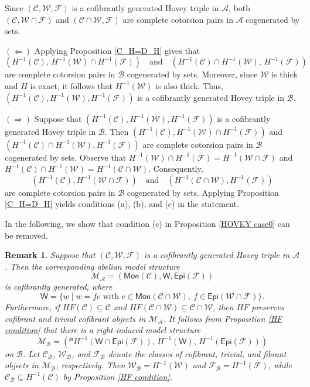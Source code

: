 \documentclass[12pt,twoside]{amsart}
\theoremstyle{bfupright head,slanted body}
\theoremstyle{bfupright head,upright body}
\theoremstyle{fixed bf head,slanted body}
\theoremstyle{fixed bf head,upright body}
\newtheorem{rmk}[res]{Remark}           \newtheorem*{rmk*}{Remark}
\theoremstyle{numbered paragraph}
\newenvironment{prf*}[1][Proof]{%
  \begin{proof}[\bf #1]
    \setcounter{equation}{0}
    \renewcommand{\theequation}{\arabic{equation}}}
  {\end{proof}
}
\numberwithin{equation}{res}
\newcommand{\calC}{\mathcal{C}}
\newcommand{\calW}{\mathcal{W}}
\newcommand{\calF}{\mathcal{F}}
\newcommand{\calA}{\mathcal{A}}
\newcommand{\calB}{\mathcal{B}}
\newcommand{\calM}{\mathcal{M}}
\newcommand{\Mon}{\mathsf{Mon}}
\newcommand{\Epi}{\mathsf{Epi}}
\newcommand{\sfW}{\mathsf{W}}
\begin{document}
\begin{prf*}
Since \((\calC,\calW,\calF)\) is a cofibrantly generated Hovey triple in \(\calA\), both \((\calC,\calW\cap\calF)\) and \((\calC\cap\calW,\calF)\) are complete cotorsion pairs in \(\calA\) cogenerated by sets.

\((\Leftarrow)\)
Applying Proposition \ref{C_H=D_H} gives that
\[
(H^{-1}(\calC),\, H^{-1}(\calW)\cap H^{-1}(\calF))
\quad\text{and}\quad
(H^{-1}(\calC)\cap H^{-1}(\calW),\, H^{-1}(\calF))
\]
are complete cotorsion pairs in \(\calB\) cogenerated by sets.
Moreover, since \(\calW\) is thick and \(H\) is exact, it follows that \(H^{-1}(\calW)\) is also thick.
Thus, \((H^{-1}(\calC),H^{-1}(\calW),H^{-1}(\calF))\) is a cofibrantly generated Hovey triple in \(\calB\).

\((\Rightarrow)\)
Suppose that \((H^{-1}(\calC),H^{-1}(\calW),H^{-1}(\calF))\) is a cofibrantly generated Hovey triple in \(\calB\).
Then
\((H^{-1}(\calC), H^{-1}(\calW)\cap H^{-1}(\calF))\)
and
\((H^{-1}(\calC)\cap H^{-1}(\calW), H^{-1}(\calF))\)
are complete cotorsion pairs in \(\calB\) cogenerated by sets.
Observe that
\(H^{-1}(\calW)\cap H^{-1}(\calF)=H^{-1}(\calW\cap\calF)\)
and
\(H^{-1}(\calC)\cap H^{-1}(\calW)=H^{-1}(\calC\cap\calW)\).
Consequently,
\[
(H^{-1}(\calC), H^{-1}(\calW\cap\calF))
\quad\text{and}\quad
(H^{-1}(\calC\cap\calW), H^{-1}(\calF))
\]
are complete cotorsion pairs in \(\calB\) cogenerated by sets.
Applying Proposition \ref{C_H=D_H} yields conditions (a), (b), and (c) in the statement.
\end{prf*}

In the following, we show that condition (c) in Proposition \ref{HOVEY case0} can be removed.

\begin{rmk}\label{rmk2.13}
Suppose that \((\calC,\calW,\calF)\) is a cofibrantly generated Hovey triple in \(\calA\). Then the corresponding abelian model structure
\[
\calM_\calA=(\Mon(\calC),\sfW,\Epi(\calF))
\]
is cofibrantly generated, where
\[
\sfW=\{ w \mid w=fc \text{ with } c\in\Mon(\calC\cap\calW),\ f\in\Epi(\calW\cap\calF)\}.
\]
Furthermore, if \(HF(\calC)\subseteq\calC\) and \(HF(\calC\cap\calW)\subseteq\calC\cap\calW\), then \(HF\) preserves cofibrant and trivial cofibrant objects in \(\calM_\calA\). It follows from Proposition \ref{HF condition} that there is a right-induced model structure
\[
\calM_{\calB}=(^{\boxslash}H^{-1}(\sfW\cap\Epi(\calF)),\, H^{-1}(\sfW),\, H^{-1}(\Epi(\calF)))
\]
on \(\mathcal B\). Let \(\calC_{\calB}\), \(\calW_{\calB}\), and \(\calF_{\calB}\) denote the classes of cofibrant, trivial, and fibrant objects in \(\calM_{\calB}\), respectively. Then \(\calW_{\calB}=H^{-1}(\calW)\) and \(\calF_{\calB}=H^{-1}(\calF)\), while \(\calC_{\calB}\subseteq H^{-1}(\calC)\) by Proposition \ref{HF condition}.
\end{rmk}
\end{document}
